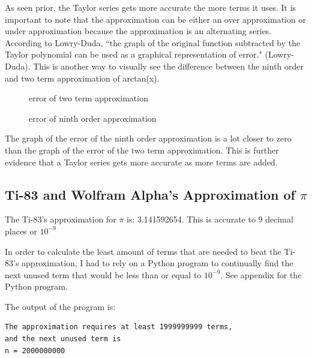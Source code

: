 \documentclass[12pt, titlepage]{article}
\begin{document}
As seen prior, the Taylor series gets more accurate the more terms it uses. It is important to note that the approximation can be either an over approximation or under approximation because the approximation is an alternating series. According to Lowry-Duda, ``the graph of the original function subtracted by the Taylor polynomial can be used as a graphical representation of error." (Lowry-Duda). This is another way to visually see the difference between the ninth order and two term approximation of arctan(x). 

\begin{figure}[H]
\centering
    \caption[]{error of two term approximation}
\end{figure}

\begin{figure}[H]
\centering
    \caption[]{error of ninth order approximation}
\end{figure}

The graph of the error of the ninth order approximation is a lot closer to zero than the graph of the error of the two term approximation. This is further evidence that a Taylor series gets more accurate as more terms are added.

\subsection{Ti-83 and Wolfram Alpha's Approximation of \(\pi\)}
The Ti-83's approximation for \(\pi\) is: 3.141592654. This is accurate to 9 decimal places or \(10^{-9}\)

In order to calculate the least amount of terms that are needed to beat the Ti-83's approximation, I had to rely on a Python program to continually find the next unused term that would be less than or equal to \(10^{-9}\). See appendix for the Python program.

The output of the program is:
\begin{verbatim}
The approximation requires at least 1999999999 terms, 
and the next unused term is 
n = 2000000000
\end{verbatim}
\end{document}
